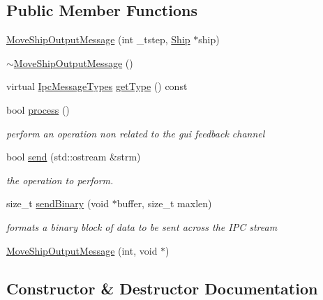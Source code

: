 \subsection*{Public Member Functions}
\begin{DoxyCompactItemize}
\item 
\mbox{\hyperlink{class_move_ship_output_message_a4de19f2ec9e088fa00387d74fd2c4dd3}{Move\+Ship\+Output\+Message}} (int \+\_\+tstep, \mbox{\hyperlink{class_ship}{Ship}} $\ast$ship)
\item 
\mbox{\hyperlink{class_move_ship_output_message_a29c3365753e26ce4d6cd548845635697}{$\sim$\+Move\+Ship\+Output\+Message}} ()
\item 
virtual \mbox{\hyperlink{ipcmsgtypes_8h_a59f75a61492e64aebfae0cc49cc26683}{Ipc\+Message\+Types}} \mbox{\hyperlink{class_move_ship_output_message_ae90a05ef8c71c5d5d0c2be4b5b540b9b}{get\+Type}} () const
\item 
bool \mbox{\hyperlink{class_move_ship_output_message_aca14c61d3c88d156378bb999efac22dc}{process}} ()
\begin{DoxyCompactList}\small\item\em perform an operation non related to the gui feedback channel \end{DoxyCompactList}\item 
bool \mbox{\hyperlink{class_move_ship_output_message_ad78fe623ef5cbb37133dc9f936005007}{send}} (std\+::ostream \&strm)
\begin{DoxyCompactList}\small\item\em the operation to perform. \end{DoxyCompactList}\item 
size\+\_\+t \mbox{\hyperlink{class_move_ship_output_message_ad3240c1a180d35dbd950f5085d31a6ba}{send\+Binary}} (void $\ast$buffer, size\+\_\+t maxlen)
\begin{DoxyCompactList}\small\item\em formats a binary block of data to be sent across the I\+PC stream \end{DoxyCompactList}\item 
\mbox{\hyperlink{class_move_ship_output_message_a72ebd45cc5b149d89081e97888c76165}{Move\+Ship\+Output\+Message}} (int, void $\ast$)
\end{DoxyCompactItemize}


\subsection{Constructor \& Destructor Documentation}
\mbox{\label{class_move_ship_output_message_a4de19f2ec9e088fa00387d74fd2c4dd3}} 
